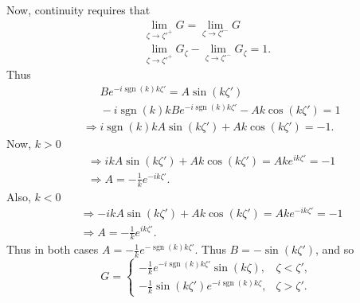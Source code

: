 \documentclass[12pt]{article}
\DeclareMathOperator{\sgn}{sgn}
\begin{document}
Now, continuity requires that 
\begin{align*}
\lim_{\zeta\to\zeta'^+} G = \lim_{\zeta\to\zeta'^-} G \\
\lim_{\zeta\to\zeta'^+} G_\zeta - \lim_{\zeta\to\zeta'^-} G_\zeta = 1. 
\end{align*}
Thus 
\begin{align*}
&\phantom{\Rightarrow} Be^{-i\sgn(k)k\zeta'} = A\sin(k\zeta') \\
&\phantom{\Rightarrow} -i\sgn(k)k Be^{-i\sgn(k)k\zeta'} - Ak\cos(k\zeta') = 1 \\
&\Rightarrow i\sgn(k)k A\sin(k\zeta') + Ak\cos(k\zeta') = -1.
\end{align*}
Now, $k>0$
\begin{align*}
&\Rightarrow ik A\sin(k\zeta') + Ak\cos(k\zeta') = A k e^{ik\zeta'} = -1 \\
& \Rightarrow A = -\frac{1}{k} e^{-ik\zeta'}.
\end{align*}
Also, $k<0$
\begin{align*}
&\Rightarrow -ik A\sin(k\zeta') + Ak\cos(k\zeta') = A k e^{-ik\zeta'} = -1 \\
& \Rightarrow A = -\frac{1}{k} e^{ik\zeta'}.
\end{align*}
Thus in both cases $A = -\frac{1}{k} e^{-\sgn(k) k \zeta'}$. Thus $B=-\sin(k\zeta')$, and so
\begin{equation*}
G=
\begin{cases} -\frac{1}{k} e^{-i\sgn(k)k\zeta'} \sin(k\zeta), & \zeta<\zeta', \\
-\frac{1}{k}\sin(k\zeta')e^{-i\sgn(k)k\zeta}, & \zeta>\zeta'. 
\end{cases}
\end{equation*}
\end{document}
